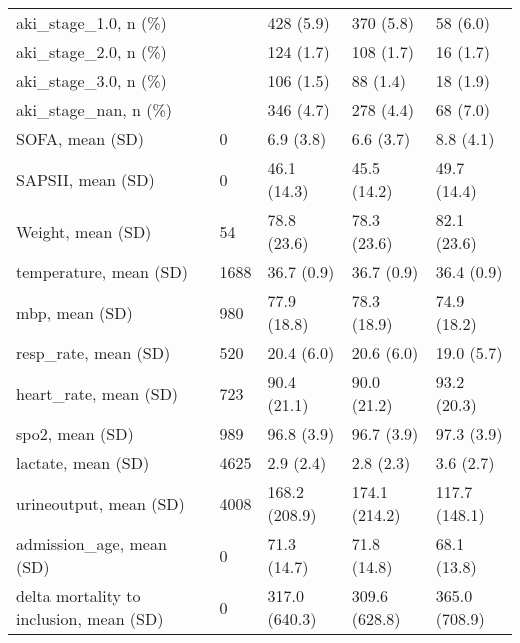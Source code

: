 \begin{tabular}{lllll}
aki\_stage\_1.0, n (\%)                              &         &      428 (5.9) &         370 (5.8) &               58 (6.0) \\
aki\_stage\_2.0, n (\%)                              &         &      124 (1.7) &         108 (1.7) &               16 (1.7) \\
aki\_stage\_3.0, n (\%)                              &         &      106 (1.5) &          88 (1.4) &               18 (1.9) \\
aki\_stage\_nan, n (\%)                              &         &      346 (4.7) &         278 (4.4) &               68 (7.0) \\
SOFA, mean (SD)                                   &       0 &      6.9 (3.8) &         6.6 (3.7) &              8.8 (4.1) \\
SAPSII, mean (SD)                                 &       0 &    46.1 (14.3) &       45.5 (14.2) &            49.7 (14.4) \\
Weight, mean (SD)                                 &      54 &    78.8 (23.6) &       78.3 (23.6) &            82.1 (23.6) \\
temperature, mean (SD)                            &    1688 &     36.7 (0.9) &        36.7 (0.9) &             36.4 (0.9) \\
mbp, mean (SD)                                    &     980 &    77.9 (18.8) &       78.3 (18.9) &            74.9 (18.2) \\
resp\_rate, mean (SD)                              &     520 &     20.4 (6.0) &        20.6 (6.0) &             19.0 (5.7) \\
heart\_rate, mean (SD)                             &     723 &    90.4 (21.1) &       90.0 (21.2) &            93.2 (20.3) \\
spo2, mean (SD)                                   &     989 &     96.8 (3.9) &        96.7 (3.9) &             97.3 (3.9) \\
lactate, mean (SD)                                &    4625 &      2.9 (2.4) &         2.8 (2.3) &              3.6 (2.7) \\
urineoutput, mean (SD)                            &    4008 &  168.2 (208.9) &     174.1 (214.2) &          117.7 (148.1) \\
admission\_age, mean (SD)                          &       0 &    71.3 (14.7) &       71.8 (14.8) &            68.1 (13.8) \\
delta mortality to inclusion, mean (SD)           &       0 &  317.0 (640.3) &     309.6 (628.8) &          365.0 (708.9) \\

\end{tabular}
